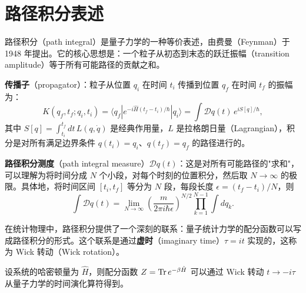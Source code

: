 \section{路径积分表述}

路径积分（path integral）是量子力学的一种等价表述，由费曼（Feynman）于 1948 年提出。它的核心思想是：一个粒子从初态到末态的跃迁振幅（transition amplitude）等于所有可能路径的贡献之和。

\begin{definition}[传播子]
\textbf{传播子}（propagator）：粒子从位置 $q_i$ 在时间 $t_i$ 传播到位置 $q_f$ 在时间 $t_f$ 的振幅为：
\begin{equation}
    K(q_f, t_f; q_i, t_i) = \langle q_f | e^{-i\hat{H}(t_f - t_i)/\hbar} | q_i \rangle = \int \mathcal{D}q(t) \, e^{iS[q]/\hbar},
\end{equation}
其中 $S[q] = \int_{t_i}^{t_f} dt \, L(q, \dot{q})$ 是经典作用量，$L$ 是拉格朗日量（Lagrangian），积分是对所有满足边界条件 $q(t_i) = q_i$、$q(t_f) = q_f$ 的路径进行的。
\end{definition}

\begin{note}
\textbf{路径积分测度}（path integral measure）$\mathcal{D}q(t)$：这是对所有可能路径的"求和"，可以理解为将时间分成 $N$ 个小段，对每个时刻的位置积分，然后取 $N \to \infty$ 的极限。具体地，将时间区间 $[t_i, t_f]$ 等分为 $N$ 段，每段长度 $\epsilon = (t_f - t_i)/N$，则
\begin{equation}
    \int \mathcal{D}q(t) = \lim_{N\to\infty} \left(\frac{m}{2\pi i \hbar \epsilon}\right)^{N/2} \prod_{k=1}^{N-1} \int dq_k.
\end{equation}
\end{note}

在统计物理中，路径积分提供了一个深刻的联系：量子统计力学的配分函数可以写成路径积分的形式。这个联系是通过\textbf{虚时}（imaginary time）$\tau = it$ 实现的，这称为 Wick 转动（Wick rotation）。

\begin{theorem}[Wick 转动]
设系统的哈密顿量为 $\hat{H}$，则配分函数 $Z = \Tr e^{-\beta\hat{H}}$ 可以通过 Wick 转动 $t \to -i\tau$ 从量子力学的时间演化算符得到。
\end{theorem}

